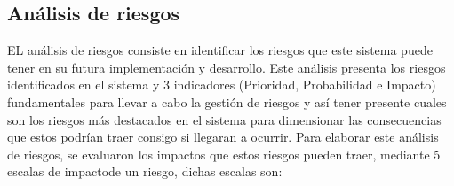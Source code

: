 \subsection{Análisis de riesgos} 

EL análisis de riesgos consiste en identificar los riesgos que este sistema puede tener en su futura implementación y desarrollo. Este análisis presenta los riesgos identificados en el sistema y 3 indicadores (Prioridad, Probabilidad e Impacto) fundamentales para llevar a cabo la gestión de riesgos y así tener presente cuales son los riesgos más destacados en el sistema para dimensionar las consecuencias que estos podrían traer consigo si llegaran a ocurrir. Para elaborar este análisis de riesgos, se evaluaron los impactos que estos riesgos pueden traer, mediante 5 escalas de impactode un riesgo, dichas escalas son: 

